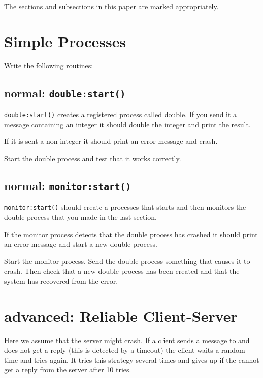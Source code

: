 \documentclass[12pt]{hitec}
\begin{document}
The sections and subsections in this paper are marked appropriately.

\section{Simple Processes}


Write the following routines:

\subsection{normal: \texttt{double:start()}}

\verb+double:start()+ creates a registered process called double.
If you send it a message containing an integer it should
double the integer and print the result.

If it is sent a non-integer it should print an error message
and crash.

Start the double process and test that it works correctly.

\subsection{normal: \texttt{monitor:start()}}

\verb+monitor:start()+ should create a processes that starts and
then monitors the double process that you made in the last section.
 
If the monitor process detects that the double process has crashed
it should print an error message and start a new double process.

Start the monitor process. Send the double process something that causes it
to crash. Then check that a new double process has been created and that
the system has recovered from the error.

\section{advanced: Reliable Client-Server}

Here we assume that the server might crash. If a client sends a message to
and does not get a reply (this is detected by a timeout) the client
waits a random time and tries again. It tries this strategy several times
and gives up if the cannot get a reply from the server after 10 tries. 
\end{document}
